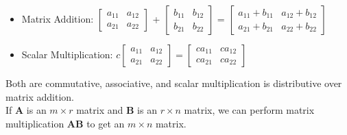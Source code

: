 \documentclass[11pt]{scrartcl}
\theoremstyle{plain}
\theoremstyle{definition}
\theoremstyle{remark}
\begin{document}
\begin{itemize}
    \item Matrix Addition: $\begin{bmatrix}a_{11} & a_{12} \\ a_{21} & a_{22}\end{bmatrix}$ + $\begin{bmatrix}
    b_{11} & b_{12} \\ b_{21} & b_{22}\end{bmatrix}$ = $\begin{bmatrix}a_{11} + b_{11} & a_{12} + b_{12} \\ 
    a_{21} + b_{21} & a_{22} + b_{22}\end{bmatrix}$
    \item Scalar Multiplication: $c\begin{bmatrix}a_{11} & a_{12} \\ a_{21} & a_{22}\end{bmatrix}=\begin{bmatrix}
    ca_{11} & ca_{12} \\ ca_{21} & ca_{22}\end{bmatrix}$
\end{itemize}

Both are commutative, associative, and scalar multiplication is distributive over matrix addition. \\[-0.5em]

If $\mathbf{A}$ is an $m\times r$ matrix and $\mathbf{B}$ is an $r\times n$ matrix, we can perform matrix 
multiplication $\mathbf{A}\mathbf{B}$ to get an $m\times n$ matrix.
\end{document}
